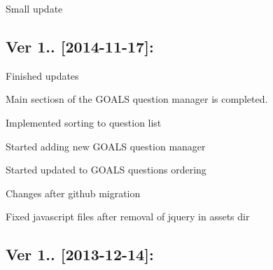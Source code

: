 \begin{DoxyItemize}
\item Small update
\end{DoxyItemize}

\subsection*{Ver 1.. \mbox{[}2014-\/11-\/17\mbox{]}\+: }


\begin{DoxyItemize}
\item Finished updates
\item Main sectiosn of the G\+O\+A\+L\+S question manager is completed.
\item Implemented sorting to question list
\item Started adding new G\+O\+A\+L\+S question manager
\item Started updated to G\+O\+A\+L\+S questions ordering
\item Changes after github migration
\item Fixed javascript files after removal of jquery in assets dir
\end{DoxyItemize}

\subsection*{Ver 1.. \mbox{[}2013-\/12-\/14\mbox{]}\+: }


